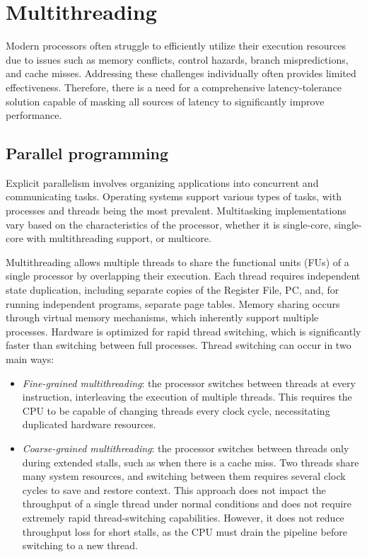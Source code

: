 \section{Multithreading}

Modern processors often struggle to efficiently utilize their execution resources due to issues such as memory conflicts, control hazards, branch mispredictions, and cache misses.
Addressing these challenges individually often provides limited effectiveness. 
Therefore, there is a need for a comprehensive latency-tolerance solution capable of masking all sources of latency to significantly improve performance.

\subsection{Parallel programming}
Explicit parallelism involves organizing applications into concurrent and communicating tasks. 
Operating systems support various types of tasks, with processes and threads being the most prevalent. 
Multitasking implementations vary based on the characteristics of the processor, whether it is single-core, single-core with multithreading support, or multicore.

Multithreading allows multiple threads to share the functional units (FUs) of a single processor by overlapping their execution. 
Each thread requires independent state duplication, including separate copies of the Register File, PC, and, for running independent programs, separate page tables. 
Memory sharing occurs through virtual memory mechanisms, which inherently support multiple processes. 
Hardware is optimized for rapid thread switching, which is significantly faster than switching between full processes.
Thread switching can occur in two main ways:
\begin{itemize}
    \item \textit{Fine-grained multithreading}: the processor switches between threads at every instruction, interleaving the execution of multiple threads. 
        This requires the CPU to be capable of changing threads every clock cycle, necessitating duplicated hardware resources.
    \item \textit{Coarse-grained multithreading}: the processor switches between threads only during extended stalls, such as when there is a cache miss. 
        Two threads share many system resources, and switching between them requires several clock cycles to save and restore context. 
        This approach does not impact the throughput of a single thread under normal conditions and does not require extremely rapid thread-switching capabilities. 
        However, it does not reduce throughput loss for short stalls, as the CPU must drain the pipeline before switching to a new thread.
\end{itemize}

